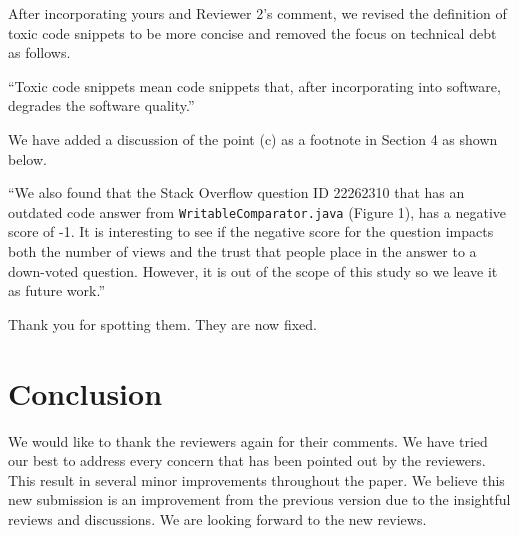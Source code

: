 \documentclass[a4paper,twoside,10pt]{reviewresponse}
\begin{document}

After incorporating yours and Reviewer 2's comment, we revised the definition of toxic code snippets to be more concise and removed the focus on technical debt as follows.

``Toxic code snippets mean code snippets that, after incorporating into software, degrades the software quality.''


We have added a discussion of the point (c) as a footnote in Section 4 as shown below.

``We also found that the Stack Overflow question ID 22262310 that has an outdated code answer from \texttt{WritableComparator.java} (Figure 1), has a negative score of -1. It is interesting to see if the negative score for the question impacts both the number of views and the trust that people place in the answer to a down-voted question. However, it is out of the scope of this study so we leave it as future work.''


Thank you for spotting them. They are now fixed.

\section{Conclusion}
We would like to thank the reviewers again for their comments.
We have tried our best to address every concern that has been pointed out by the reviewers. This result in several minor improvements throughout the paper.
We believe this new submission is an improvement from the previous version due to the insightful reviews and discussions. We are looking forward to the new reviews.

%


\end{document}
